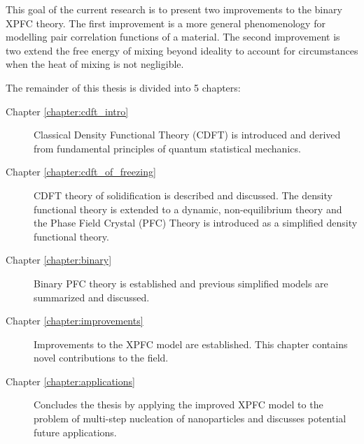 
This goal of the current research is to present two improvements to the
binary XPFC theory. The first improvement is a more general phenomenology
for modelling pair correlation functions of a material. The second 
improvement is two extend the free energy of mixing beyond ideality to 
account for circumstances when the heat of mixing is not negligible.


The remainder of this thesis is divided into 5 chapters:
%
\begin{description}
    \item [Chapter \ref{chapter:cdft_intro}] { Classical Density Functional
        Theory (CDFT) is introduced and derived from fundamental principles of
        quantum statistical mechanics.
    }
    \item [Chapter \ref{chapter:cdft_of_freezing}] { CDFT theory of
        solidification is described and discussed. The density functional
        theory is extended to a dynamic, non-equilibrium theory and the Phase
        Field Crystal (PFC) Theory is introduced as a simplified density
        functional theory.
    }
    \item [Chapter \ref{chapter:binary}] { Binary PFC theory is established and
        previous simplified models are summarized and discussed.
    }
    \item [Chapter \ref{chapter:improvements}] { Improvements to the XPFC model
        are established. This chapter contains novel contributions to the field.
    }
    \item [Chapter \ref{chapter:applications}] { Concludes the thesis by
        applying the improved XPFC model to the problem of multi-step nucleation
        of nanoparticles and discusses potential future applications.
    } 
\end{description}
%
